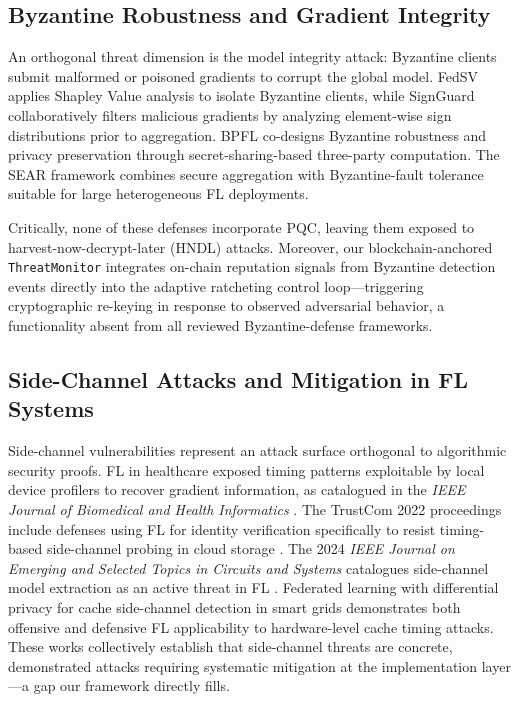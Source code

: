 \documentclass[journal, 10pt, twocolumn]{IEEEtran}
\begin{document}
\subsection{Byzantine Robustness and Gradient Integrity}
An orthogonal threat dimension is the model integrity attack: Byzantine clients submit malformed or poisoned gradients to corrupt the global model. FedSV \cite{fedsv} applies Shapley Value analysis to isolate Byzantine clients, while SignGuard \cite{signguard} collaboratively filters malicious gradients by analyzing element-wise sign distributions prior to aggregation. BPFL \cite{bpfl} co-designs Byzantine robustness and privacy preservation through secret-sharing-based three-party computation. The SEAR framework \cite{sear} combines secure aggregation with Byzantine-fault tolerance suitable for large heterogeneous FL deployments.

Critically, none of these defenses incorporate PQC, leaving them exposed to harvest-now-decrypt-later (HNDL) attacks. Moreover, our blockchain-anchored \texttt{ThreatMonitor} integrates on-chain reputation signals from Byzantine detection events directly into the adaptive ratcheting control loop---triggering cryptographic re-keying in response to observed adversarial behavior, a functionality absent from all reviewed Byzantine-defense frameworks.

\subsection{Side-Channel Attacks and Mitigation in FL Systems}
Side-channel vulnerabilities represent an attack surface orthogonal to algorithmic security proofs. FL in healthcare exposed timing patterns exploitable by local device profilers to recover gradient information, as catalogued in the \textit{IEEE Journal of Biomedical and Health Informatics} \cite{sc_healthcare}. The TrustCom 2022 proceedings include defenses using FL for identity verification specifically to resist timing-based side-channel probing in cloud storage \cite{sc_trustcom}. The 2024 \textit{IEEE Journal on Emerging and Selected Topics in Circuits and Systems} catalogues side-channel model extraction as an active threat in FL \cite{sc_trustworthy_ai}. Federated learning with differential privacy for cache side-channel detection in smart grids \cite{sc_smartgrid} demonstrates both offensive and defensive FL applicability to hardware-level cache timing attacks. These works collectively establish that side-channel threats are concrete, demonstrated attacks requiring systematic mitigation at the implementation layer---a gap our framework directly fills.
\end{document}
